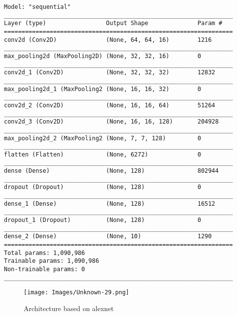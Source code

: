 \documentclass[11pt, a4paper]{article}
\begin{document}
\begin{center}

\begin{verbatim}
Model: "sequential"
_________________________________________________________________
Layer (type)                 Output Shape              Param #   
=================================================================
conv2d (Conv2D)              (None, 64, 64, 16)        1216      
_________________________________________________________________
max_pooling2d (MaxPooling2D) (None, 32, 32, 16)        0         
_________________________________________________________________
conv2d_1 (Conv2D)            (None, 32, 32, 32)        12832     
_________________________________________________________________
max_pooling2d_1 (MaxPooling2 (None, 16, 16, 32)        0         
_________________________________________________________________
conv2d_2 (Conv2D)            (None, 16, 16, 64)        51264     
_________________________________________________________________
conv2d_3 (Conv2D)            (None, 16, 16, 128)       204928    
_________________________________________________________________
max_pooling2d_2 (MaxPooling2 (None, 7, 7, 128)         0         
_________________________________________________________________
flatten (Flatten)            (None, 6272)              0         
_________________________________________________________________
dense (Dense)                (None, 128)               802944    
_________________________________________________________________
dropout (Dropout)            (None, 128)               0         
_________________________________________________________________
dense_1 (Dense)              (None, 128)               16512     
_________________________________________________________________
dropout_1 (Dropout)          (None, 128)               0         
_________________________________________________________________
dense_2 (Dense)              (None, 10)                1290      
=================================================================
Total params: 1,090,986
Trainable params: 1,090,986
Non-trainable params: 0
_________________________________________________________________
\end{verbatim}
\label{fig: alex_net_1}
\end{center}

\begin{figure}[htp]
\centering
\texttt{[image: Images/Unknown-29.png]} 
\caption{Architecture based on alexnet}
\label{fig: alex_arch}
\end{figure}
\end{document}
